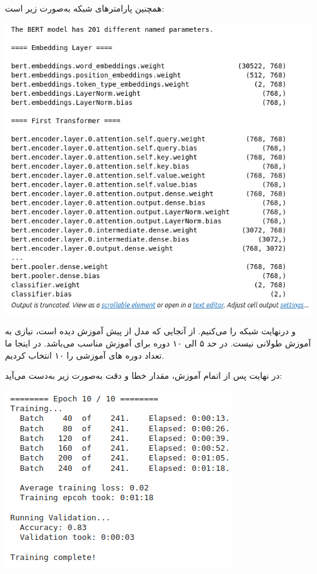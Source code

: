 \begin{qsolve}
	همچنین پارامتر‌های شبکه به‌صورت زیر است:
	
	\begin{center}
		\includegraphics*[width=0.7\linewidth]{pics/img14.png}
		\label{پارامتر‌های شبکه}
	\end{center}
	
	و درنهایت شبکه را  می‌کنیم. از آنجایی که مدل از پیش آموزش دیده است، نیازی به آموزش طولانی نیست. در حد ۵ الی ۱۰ دوره برای آموزش مناسب می‌باشد. در اینجا ما تعداد دوره های آموزشی را ۱۰ انتخاب کردیم.
	
	در نهایت پس از اتمام آموزش، مقدار خطا و دقت به‌صورت زیر به‌دست می‌آید:
	
	\begin{center}
		\includegraphics*[width=0.5\linewidth]{pics/img16.png}
		\label{مقدار دقت و خطا در پایان آموزش}
	\end{center}
\end{qsolve}



